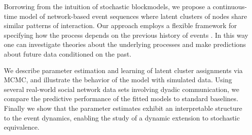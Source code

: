 %

Borrowing from the intuition of stochastic blockmodels, we propose a continuous-time model of network-based event sequences where latent clusters of nodes share similar patterns of interaction.
Our approach employs a flexible framework for  specifying how the process depends on the previous history of events \cite{AalenOddO.2008, Butts2008}.
In this way one can investigate theories about the underlying processes and make predictions about future data conditioned on the past.

We describe parameter estimation and learning of  latent cluster assignments via MCMC, and illustrate the behavior of the model with simulated data.
Using several real-world social network data sets involving dyadic communication, we compare the predictive performance of the fitted models to standard baselines.
Finally we show that the parameter estimates exhibit an interpretable structure to the event dynamics, enabling the study of a dynamic extension to stochastic equivalence.

